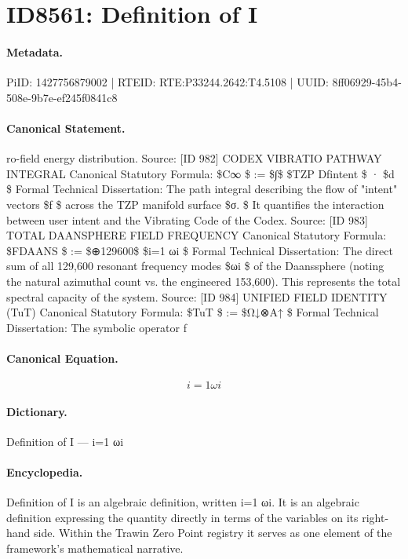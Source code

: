 \section*{ID8561: Definition of I}
\paragraph{Metadata.}
PiID: 1427756879002 | RTEID: RTE:P33244.2642:T4.5108 | UUID: 8ff06929-45b4-508e-9b7e-ef245f0841c8

\paragraph{Canonical Statement.}
ro-field energy distribution. Source: [ID 982] CODEX VIBRATIO PATHWAY INTEGRAL Canonical Statutory Formula: \$C∞ \$ := \$∫\$ \$TZP Df⃗intent \$ · \$dσ⃗ \$ Formal Technical Dissertation: The path integral describing the flow of "intent" vectors \$f⃗ \$ across the TZP manifold surface \$σ. \$ It quantifies the interaction between user intent and the Vibrating Code of the Codex. Source: [ID 983] TOTAL DAANSPHERE FIELD FREQUENCY Canonical Statutory Formula: \$FDAANS \$ := \$⊕129600\$ \$i=1 ωi \$ Formal Technical Dissertation: The direct sum of all 129,600 resonant frequency modes \$ωi \$ of the Daanssphere (noting the natural azimuthal count vs. the engineered 153,600). This represents the total spectral capacity of the system. Source: [ID 984] UNIFIED FIELD IDENTITY (TuT) Canonical Statutory Formula: \$TuT \$ := \$Ω↓⊗A↑ \$ Formal Technical Dissertation: The symbolic operator f

\paragraph{Canonical Equation.}
\[
i=1 ωi
\]

\paragraph{Dictionary.}
Definition of I — i=1 ωi

\paragraph{Encyclopedia.}
Definition of I is an algebraic definition, written i=1 ωi. It is an algebraic definition expressing the quantity directly in terms of the variables on its right-hand side. Within the Trawin Zero Point registry it serves as one element of the framework's mathematical narrative.
